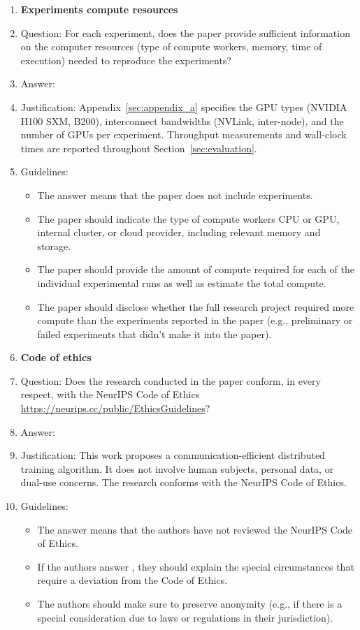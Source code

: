 \documentclass{article}
\begin{document}
\begin{enumerate}
\item {\bf Experiments compute resources}
    \item[] Question: For each experiment, does the paper provide sufficient information on the computer resources (type of compute workers, memory, time of execution) needed to reproduce the experiments?
    \item[] Answer: \answerYes{}
    \item[] Justification: Appendix~\ref{sec:appendix_a} specifies the GPU types (NVIDIA H100 SXM, B200), interconnect bandwidths (NVLink, inter-node), and the number of GPUs per experiment. Throughput measurements and wall-clock times are reported throughout Section~\ref{sec:evaluation}.
    \item[] Guidelines:
    \begin{itemize}
        \item The answer \answerNA{} means that the paper does not include experiments.
        \item The paper should indicate the type of compute workers CPU or GPU, internal cluster, or cloud provider, including relevant memory and storage.
        \item The paper should provide the amount of compute required for each of the individual experimental runs as well as estimate the total compute. 
        \item The paper should disclose whether the full research project required more compute than the experiments reported in the paper (e.g., preliminary or failed experiments that didn't make it into the paper). 
    \end{itemize}
    
\item {\bf Code of ethics}
    \item[] Question: Does the research conducted in the paper conform, in every respect, with the NeurIPS Code of Ethics \url{https://neurips.cc/public/EthicsGuidelines}?
    \item[] Answer: \answerYes{}
    \item[] Justification: This work proposes a communication-efficient distributed training algorithm. It does not involve human subjects, personal data, or dual-use concerns. The research conforms with the NeurIPS Code of Ethics.
    \item[] Guidelines:
    \begin{itemize}
        \item The answer \answerNA{} means that the authors have not reviewed the NeurIPS Code of Ethics.
        \item If the authors answer \answerNo, they should explain the special circumstances that require a deviation from the Code of Ethics.
        \item The authors should make sure to preserve anonymity (e.g., if there is a special consideration due to laws or regulations in their jurisdiction).
    \end{itemize}



\end{enumerate}
\end{document}
